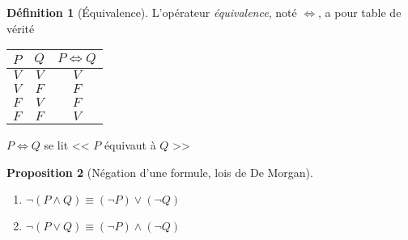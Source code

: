 \documentclass[11pt]{article}
\theoremstyle{definition}
\newtheorem{defn}{Définition}[section]
\newtheorem{prop}[defn]{Proposition}
\theoremstyle{remark}
\begin{document}
\begin{defn}[Équivalence]
L'opérateur \textit{équivalence}, noté $\Leftrightarrow$, a pour table de vérité
\begin{table}[h]
\centering
\begin{tabular}{|c|c|c|}\hline
$P$ & $Q$ & $P\Leftrightarrow Q$ \\ \hline
$V$ & $V$ & $V$ \\\hline
$V$ & $F$ & $F$ \\\hline
$F$ & $V$ & $F$ \\\hline
$F$ & $F$ & $V$ \\\hline
\end{tabular}
\end{table}
$P\Leftrightarrow Q$ se lit << $P$ équivaut à $Q$ >>
\end{defn}

\begin{prop}[Négation d'une formule, lois de De Morgan]\leavevmode
\begin{enumerate}
\item $\neg(P\land Q) \equiv (\neg P)\lor(\neg Q)$
\item $\neg(P\lor Q) \equiv (\neg P)\land (\neg Q)$
\end{enumerate}
\end{prop}
\end{document}
